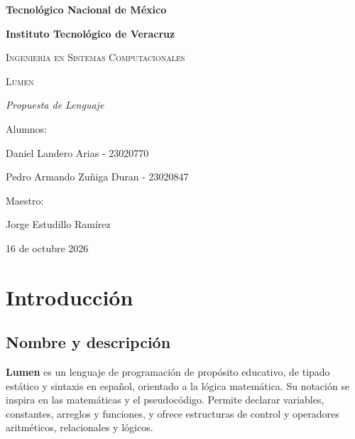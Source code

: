 \documentclass[spanish,11pt,letterpaper]{article}
\begin{document}
	\begin{titlepage}
		\centering
		{\bfseries\LARGE Tecnol\'ogico Nacional de M\'exico \par}
		{\bfseries\LARGE Instituto Tecnol\'ogico de Veracruz \par}
		\vspace{1cm}
		{\scshape\LARGE Ingenier\'ia en Sistemas Computacionales \par}
		
		\vfill
		
		{\scshape\huge Lumen\par}
		{\itshape\LARGE Propuesta de Lenguaje\par}
		
		\vfill
		
		{\Large Alumnos: \par}
		{\Large Daniel Landero Arias - 23020770\par}
		{\Large Pedro Armando Zuñiga Duran - 23020847\par}
		\vspace{0.5cm}
		{\Large Maestro: \par}
		{\Large  Jorge Estudillo Ram\'irez\par}
		
		\vfill
		
		{\Large 16 de octubre 2026 \par}
	\end{titlepage}
	
	\tableofcontents
	\newpage
	
	\section{Introducci\'on}
	\subsection{Nombre y descripci\'on}
	\textbf{Lumen} es un lenguaje de programaci\'on de prop\'osito educativo, de tipado est\'atico y sintaxis en español, orientado a la l\'ogica matem\'atica. Su notaci\'on se inspira en las matem\'aticas y el pseudoc\'odigo. Permite declarar variables, constantes, arreglos y funciones, y ofrece estructuras de control y operadores aritm\'eticos, relacionales y l\'ogicos.
	
\end{document}
